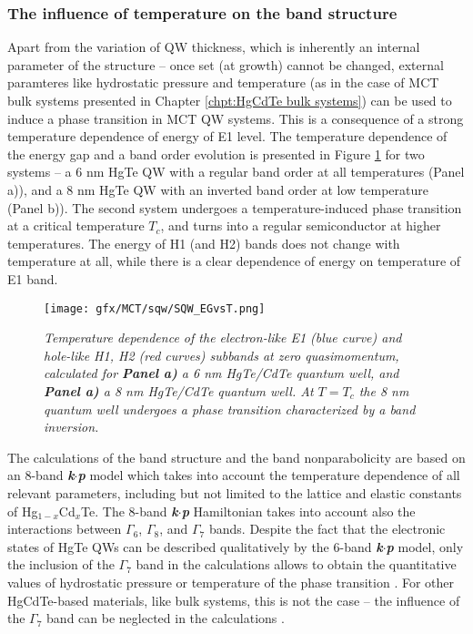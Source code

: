 \documentclass[titlepage,a4paper]{book}
\newcommand{\wciecie}{\quad\phantom{v}}
\begin{document}
\subsubsection{The influence of temperature on the band structure}
\wciecie
Apart from the variation of QW thickness, which is inherently an internal parameter of the structure -- once set (at growth) cannot be changed, external paramteres like hydrostatic pressure \cite{Krishtopenko_pressure} and temperature \cite{Wiedmann_State} (as in the case of MCT bulk systems presented in Chapter \ref{chpt:HgCdTe bulk systems}) can be used to induce a phase transition in MCT QW systems. This is a consequence of a strong temperature dependence of energy of E1 level. The temperature dependence of the energy gap and a band order evolution is presented in Figure \ref{fig:SQW_EGvsT} for two systems -- a 6 nm HgTe QW with a regular band order at all temperatures (Panel a)), and a 8 nm HgTe QW with an inverted band order at low temperature (Panel b)). The second system undergoes a temperature-induced phase transition at a critical temperature $T_c$, and turns into a regular semiconductor at higher temperatures. The energy of H1 (and H2) bands does not change with temperature at all, while there is a clear dependence of energy on temperature of E1 band.

\begin{figure}[H]
	\centering
	\texttt{[image: gfx/MCT/sqw/SQW\_EGvsT.png]}
	\vspace{-10pt}
	\caption{\textit{Temperature dependence of the electron-like E1 (blue curve) and hole-like H1, H2 (red curves) subbands at zero quasimomentum, calculated for \textbf{Panel a)} a 6 nm HgTe/CdTe quantum well, and \textbf{Panel a)} a 8 nm HgTe/CdTe quantum well. At $T = T_c$ the 8 nm quantum well undergoes a phase transition characterized by a band inversion.}}
	\label{fig:SQW_EGvsT}
\end{figure} 

The calculations of the band structure and the band nonparabolicity are based on an 8-band \textbf{\textit{k$\cdot$p}} model which takes into account the temperature dependence of all relevant parameters, including but not limited to the lattice and elastic constants of Hg$_{1-x}$Cd$_x$Te. The 8-band \textbf{\textit{k$\cdot$p}} Hamiltonian takes into account also the interactions between $\Gamma_6$, $\Gamma_8$, and $\Gamma_7$ bands. Despite the fact that the electronic states of HgTe QWs can be described qualitatively by the 6-band \textbf{\textit{k$\cdot$p}} model, only the inclusion of the $\Gamma_7$ band in the calculations allows to obtain the quantitative values of hydrostatic pressure or temperature of the phase transition \cite{Krishtopenko_pressure}. For other HgCdTe-based materials, like bulk systems, this is not the case -- the influence of the $\Gamma_7$ band can be neglected in the calculations \cite{Malcolm_MCT}.
\end{document}
